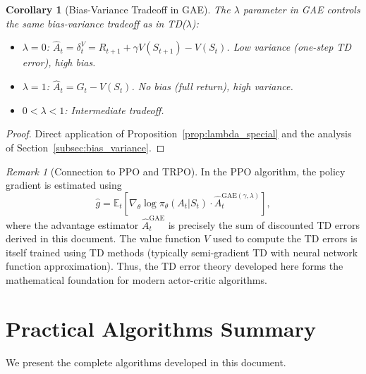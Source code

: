 \documentclass[11pt,a4paper]{article}
\theoremstyle{definition}
\theoremstyle{plain}
\newtheorem{corollary}[theorem]{Corollary}
\theoremstyle{remark}
\newtheorem{remark}{Remark}[section]
\newcommand{\E}{\mathbb{E}}
\begin{document}
\begin{corollary}[Bias-Variance Tradeoff in GAE]
\label{cor:gae_bv}
The $\lambda$ parameter in GAE controls the same bias-variance tradeoff as in TD($\lambda$):
\begin{itemize}[nosep]
    \item $\lambda = 0$: $\hat{A}_t = \delta_t^V = R_{t+1} + \gamma V(S_{t+1}) - V(S_t)$. Low variance (one-step TD error), high bias.
    \item $\lambda = 1$: $\hat{A}_t = G_t - V(S_t)$. No bias (full return), high variance.
    \item $0 < \lambda < 1$: Intermediate tradeoff.
\end{itemize}
\end{corollary}

\begin{proof}
Direct application of Proposition~\ref{prop:lambda_special} and the analysis of Section~\ref{subsec:bias_variance}.
\end{proof}

\begin{remark}[Connection to PPO and TRPO]
\label{rem:gae_ppo}
In the PPO algorithm, the policy gradient is estimated using
\begin{equation}
    \hat{g} = \E_t\!\left[\nabla_\theta \log \pi_\theta(A_t|S_t) \cdot \hat{A}_t^{\text{GAE}(\gamma,\lambda)}\right],
\end{equation}
where the advantage estimator $\hat{A}_t^{\text{GAE}}$ is precisely the sum of discounted TD errors derived in this document. The value function $V$ used to compute the TD errors is itself trained using TD methods (typically semi-gradient TD with neural network function approximation). Thus, the TD error theory developed here forms the mathematical foundation for modern actor-critic algorithms.
\end{remark}

\section{Practical Algorithms Summary}
\label{sec:algorithms}

We present the complete algorithms developed in this document.
\end{document}
